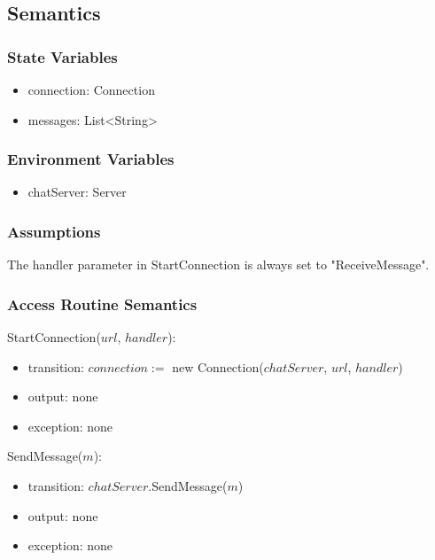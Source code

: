 \documentclass[12pt, titlepage]{article}
\begin{document}
\subsection{Semantics}

\subsubsection{State Variables}

\begin{itemize}
\item connection: Connection
\item messages: List\textless String\textgreater
\end{itemize}

\subsubsection{Environment Variables}

\begin{itemize}
\item chatServer: Server
\end{itemize}

\subsubsection{Assumptions}

The handler parameter in StartConnection is always set to "ReceiveMessage".

\subsubsection{Access Routine Semantics}

\noindent StartConnection($url$, $handler$):
\begin{itemize}
\item transition: $connection := $ new Connection($chatServer$, $url$, $handler$)
\item output: none
\item exception: none
\end{itemize}

\noindent SendMessage($m$):
\begin{itemize}
\item transition: $chatServer$.SendMessage($m$)
\item output: none
\item exception: none
\end{itemize}
\end{document}
